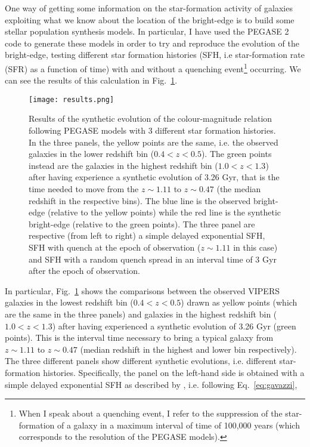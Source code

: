 \documentclass[11pt]{article}
\begin{document}
One way of getting some information on the star-formation activity of galaxies exploiting what we know about the location of the bright-edge is to build some stellar population synthesis models. 
In particular, I have used the PEGASE 2 code to generate these models in order to try and reproduce the evolution of the bright-edge, testing different star formation histories (SFH, i.e star-formation rate (SFR) as a function of time) with and without a quenching event\footnote{When I speak about a quenching event, I refer to the suppression of the star-formation of a galaxy in a maximum interval of time of 100,000 years (which corresponds to the resolution of the PEGASE models).} occurring. 
We can see the results of this calculation in Fig.~\ref{fig:vipers_results}.
%
\begin{figure}
\centering
\texttt{[image: results.png]}
\caption{Results of the synthetic evolution of the colour-magnitude relation following PEGASE models with 3 different star formation histories. In the three panels, the yellow points are the same, i.e. the observed galaxies in the lower redshift bin ($0.4<z<0.5$). The green points instead are the galaxies in the highest redshift bin ($1.0<z<1.3$) after having experience a synthetic evolution of 3.26 Gyr, that is the time needed to move from the $z\sim 1.11$ to $z\sim 0.47$ (the median redshift in the respective bins). The blue line is the observed bright-edge (relative to the yellow points) while the red line is the synthetic bright-edge (relative to the green points). The three panel are respective (from left to right) a simple delayed exponential SFH, SFH with quench at the epoch of observation ($z\sim1.11$ in this case) and SFH with a random quench spread in an interval time of 3 Gyr after the epoch of observation. }
\label{fig:vipers_results}
\end{figure}
%
In particular, Fig.~\ref{fig:vipers_results} shows the comparisons between the observed VIPERS galaxies in the lowest redshift bin ($0.4<z<0.5$) drawn as yellow points (which are the same in the three panels) and galaxies in the highest redshift bin ($1.0<z<1.3$) after having experienced a synthetic evolution of 3.26 Gyr (green points). This is the interval time necessary to bring a typical galaxy from $z\sim1.11$ to $z\sim0.47$ (median redshift in the highest and lower bin respectively). The three different panels show different synthetic evolutions, i.e. different star-formation histories. Specifically, the panel on the left-hand side is obtained with a simple delayed exponential SFH as described by \cite{gavazzi02}, i.e. following Eq.~\ref{eq:gavazzi}, 
\end{document}
